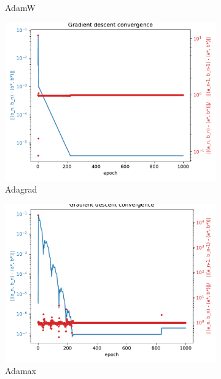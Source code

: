 \documentclass[12pt]{article}
\begin{document}
\begin{figure}[htbp]
\begin{subfigure}[t]{0.48\textwidth}
        \caption{AdamW}
    \end{subfigure}
    \centering
    \begin{subfigure}[t]{0.48\textwidth}
        \centering
        \includegraphics[width=\textwidth]{Homework1/ex2x3.pdf}
        \caption{Adagrad}
    \end{subfigure}
    \begin{subfigure}[t]{0.48\textwidth}
        \centering
        \includegraphics[width=\textwidth]{Homework1/ex2x4.pdf}
        \caption{Adamax}
    \end{subfigure}
    \centering
    \begin{subfigure}[t]{0.48\textwidth}
        \centering

\end{subfigure}
\end{figure}
\end{document}
